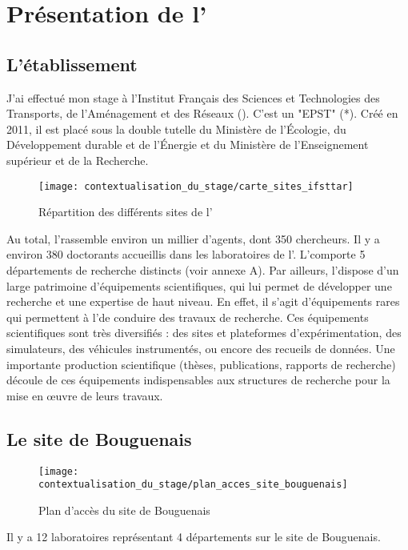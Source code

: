 \section{Présentation de l'\ifsttar}
  \subsection{L'établissement}

J'ai effectué mon stage à l'Institut Français des Sciences et Technologies des Transports, de l'Aménagement et des Réseaux (\ifsttar). C'est un "\glsdesc{EPST}" (*). Créé en 2011, il est placé sous la double tutelle du Ministère de l'Écologie, du Développement durable et de l'Énergie et du Ministère de l'Enseignement supérieur et de la Recherche.

\begin{figure}
  \centering
  \texttt{[image: contextualisation\_du\_stage/carte\_sites\_ifsttar]}
  \caption{Répartition des différents sites de l'\ifsttar}
\end{figure}

Au total, l'\ifsttar rassemble environ un millier d'agents, dont 350 chercheurs. Il y a environ 380 doctorants accueillis dans les laboratoires de l’\ifsttar. L'\ifsttar comporte 5 départements de recherche distincts (voir annexe A). Par ailleurs, l’\ifsttar dispose d’un large patrimoine d’équipements scientifiques, qui lui permet de développer une recherche et une expertise de haut niveau. En effet, il s’agit d’équipements rares qui permettent à l’\ifsttar de conduire des travaux de recherche. Ces équipements scientifiques  sont très diversifiés : des sites et plateformes d'expérimentation, des simulateurs, des véhicules instrumentés, ou encore des recueils de données. Une importante production scientifique (thèses, publications, rapports de recherche) découle de ces équipements indispensables aux structures de recherche pour la mise en œuvre de leurs travaux.

  \subsection{Le site de Bouguenais}

\begin{figure}
  \centering
  \texttt{[image: contextualisation\_du\_stage/plan\_acces\_site\_bouguenais]}
  \caption{Plan d'accès du site de Bouguenais}
\end{figure}

Il y a 12 laboratoires représentant 4 départements sur le site de Bouguenais.

